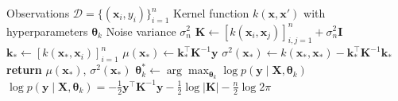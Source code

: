 \documentclass[11pt]{article}
\begin{document}
\begin{algorithm}[t]
\caption{Gaussian Process Surrogate Update}\label{alg:gp}
\begin{algorithmic}[1]
\Require Observations $\mathcal{D} = \{(\mathbf{x}_i, y_i)\}_{i=1}^n$
\Require Kernel function $k(\mathbf{x}, \mathbf{x}')$ with hyperparameters $\boldsymbol{\theta}_k$
\Require Noise variance $\sigma_n^2$
    \State $\mathbf{K} \gets [k(\mathbf{x}_i, \mathbf{x}_j)]_{i,j=1}^n + \sigma_n^2 \mathbf{I}$
    \State $\mathbf{k}_* \gets [k(\mathbf{x}_*, \mathbf{x}_i)]_{i=1}^n$
    \State $\mu(\mathbf{x}_*) \gets \mathbf{k}_*^\top \mathbf{K}^{-1} \mathbf{y}$
    \State $\sigma^2(\mathbf{x}_*) \gets k(\mathbf{x}_*, \mathbf{x}_*) - \mathbf{k}_*^\top \mathbf{K}^{-1} \mathbf{k}_*$
    \State \textbf{return} $\mu(\mathbf{x}_*)$, $\sigma^2(\mathbf{x}_*)$
\EndFunction
\Statex
{}
    \State $\boldsymbol{\theta}_k^* \gets \arg\max_{\boldsymbol{\theta}_k} \log p(\mathbf{y} \mid \mathbf{X}, \boldsymbol{\theta}_k)$
    \State $\log p(\mathbf{y} \mid \mathbf{X}, \boldsymbol{\theta}_k) = -\tfrac{1}{2} \mathbf{y}^\top \mathbf{K}^{-1} \mathbf{y} - \tfrac{1}{2} \log |\mathbf{K}| - \tfrac{n}{2} \log 2\pi$
\EndProcedure
\end{algorithmic}
\end{algorithm}
\end{document}
